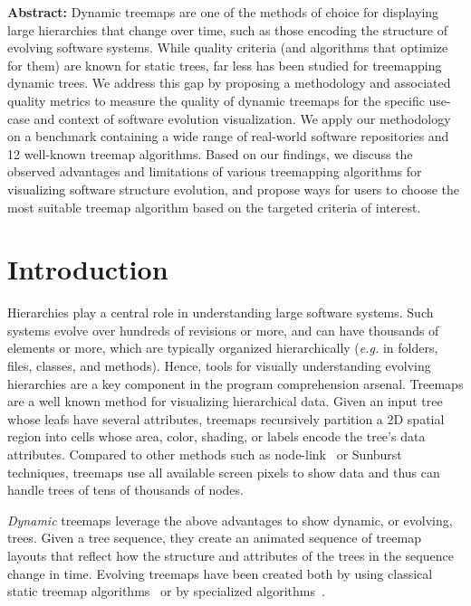 \noindent \textbf{Abstract:}
Dynamic treemaps are one of the methods of choice for displaying large hierarchies that change over time, such as those encoding the structure of evolving software systems. While quality criteria (and algorithms that optimize for them) are known for static trees, far less has been studied for treemapping dynamic trees. We address this gap by proposing a methodology and associated quality metrics to measure the quality of dynamic treemaps for the specific use-case and context of software evolution visualization. We apply our methodology on a benchmark containing a wide range of real-world software repositories and 12 well-known treemap algorithms. Based on our findings, we discuss the observed advantages and limitations of various treemapping algorithms for visualizing software structure evolution, and propose ways for users to choose the most suitable treemap algorithm based on the targeted criteria of interest.

\section{Introduction}
%
%
Hierarchies play a central role in understanding large software systems. Such systems evolve over hundreds of revisions or more, and can have thousands of elements or more, which are typically organized hierarchically (\emph{e.g.} in folders, files, classes, and methods). Hence, tools for visually understanding evolving hierarchies are a key component in the program comprehension arsenal. Treemaps are a well known method for visualizing hierarchical data. Given an input tree whose leafs have several attributes, treemaps recursively partition a 2D spatial region into cells whose area, color, shading, or labels encode the tree's data attributes. Compared to other methods such as node-link~\citep{harel,frick} or Sunburst~\citep{sunburst,sunburst2} techniques, treemaps use all available screen pixels to show data and thus can handle trees of tens of thousands of nodes.

\emph{Dynamic} treemaps leverage the above advantages to show dynamic, or evolving, trees. Given a tree sequence, they create an animated sequence of treemap layouts that reflect how the structure and attributes of the trees in the sequence change in time. Evolving treemaps have been created both by using classical static treemap algorithms~\citep{treevis} or by specialized algorithms~\citep{sondag17,hees17,hahn10}.

